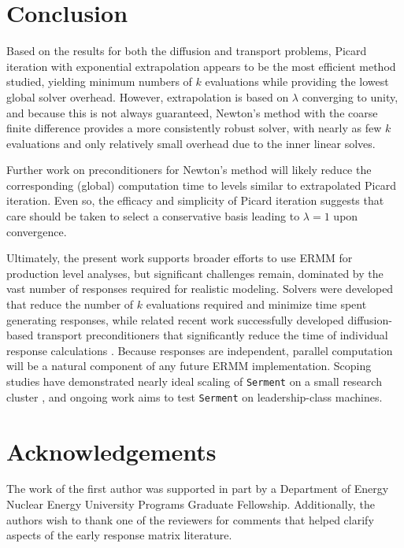\section{Conclusion}
\label{sec:conclusion}

Based on the results for both the diffusion and transport problems, Picard 
iteration with exponential extrapolation appears to be the most
efficient method studied, yielding minimum numbers of $k$ evaluations 
while providing the lowest global solver overhead.  However,  
extrapolation is based on $\lambda$ converging to unity, and because this 
is not always guaranteed, Newton's method with the coarse finite difference 
provides a more consistently robust solver, with nearly as 
few $k$ evaluations and only relatively small overhead due to the 
inner linear solves.

Further work on preconditioners for Newton's method 
will likely reduce the corresponding (global) computation time 
to levels similar to extrapolated Picard iteration.  
Even so, the efficacy and 
simplicity of Picard iteration suggests that care should be taken to 
select a conservative basis leading to $\lambda = 1$ upon convergence.

Ultimately, the present work supports broader efforts to use 
ERMM for production level analyses, but significant challenges remain,
dominated by the vast number of responses required for realistic 
modeling.  Solvers were developed that reduce the number of $k$ evaluations 
required and minimize time spent generating  
responses, while related recent work successfully developed diffusion-based 
transport preconditioners that significantly reduce the time of 
individual response calculations \cite{roberts2014dpm}.  Because 
responses are independent, parallel computation will be a natural
component of 
any future ERMM implementation.  Scoping studies have demonstrated 
nearly ideal scaling of {\tt Serment} on a small research 
cluster \cite{roberts2014arm}, and ongoing work aims to test {\tt Serment} on 
leadership-class machines.

\section*{Acknowledgements}

The work of the first author was supported in part by a
Department of Energy Nuclear Energy University Programs Graduate Fellowship.
Additionally, the authors wish to thank one of the reviewers
for comments that helped clarify aspects of the early response 
matrix literature.